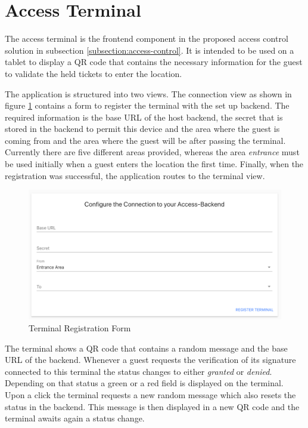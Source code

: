 \section{Access Terminal}\label{design:access-terminal}
The access terminal is the frontend component in the proposed access control solution in subsection \ref{subsection:access-control}. It is intended to be used on a tablet to display a QR code that contains the necessary information for the guest to validate the held tickets to enter the location.

The application is structured into two views. The connection view as shown in figure \ref{img:terminal-registration-form} contains a form to register the terminal with the set up backend. The required information is the base URL of the host backend, the secret that is stored in the backend to permit this device and the area where the guest is coming from and the area where the guest will be after passing the terminal. Currently there are five different areas provided, whereas the area \textit{entrance} must be used initially when a guest enters the location the first time. Finally, when the registration was successful, the application routes to the terminal view.

\begin{figure}[H]
    \centering
    \includegraphics[width=15cm]{images/terminal-registration.png}
    \caption{Terminal Registration Form \protect}
    \label{img:terminal-registration-form}
\end{figure}

The terminal shows a QR code that contains a random message and the base URL of the backend. Whenever a guest requests the verification of its signature connected to this terminal the status changes to either \textit{granted} or \textit{denied}. Depending on that status a green or a red field is displayed on the terminal. Upon a click the terminal requests a new random message which also resets the status in the backend. This message is then displayed in a new QR code and the terminal awaits again a status change.
